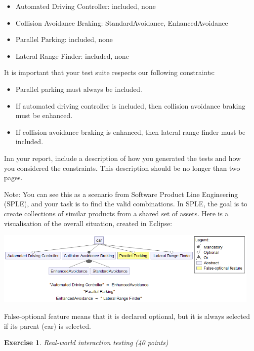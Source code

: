 \documentclass{pracs}
\newtheorem{exercise}{Exercise}
\begin{document}
\begin{itemize}
\item Automated Driving Controller: included, none
\item Collision Avoidance Braking: StandardAvoidance, EnhancedAvoidance
\item Parallel Parking: included, none
\item Lateral Range Finder: included, none
\end{itemize}

It is important that your test suite respects our following constraints:
\begin{itemize}
\item Parallel parking must always be included.
\item If automated driving controller is included, then collision avoidance braking must be enhanced.
\item If collision avoidance braking is enhanced, then lateral range finder must be included.
\end{itemize}

Inn your report, include a description of how you generated the tests and how you considered the constraints. This description should be no longer than two pages.

Note: You can see this as a scenario from Software Product Line Engineering (SPLE), and your task is to find the valid combinations. In SPLE, the goal is to create collections of similar products from a shared set of assets. Here is a visualisation of the overall situation, created in Eclipse:

\begin{center}
\includegraphics[width=130mm]{q3p2_car_assignment1AbstractConstraints.png}
\end{center}

False-optional feature means that it is declared optional, but it is always selected if its parent (car) is selected.


\begin{exercise}
Real-world interaction testing (40 points)
\end{exercise}
\end{document}
